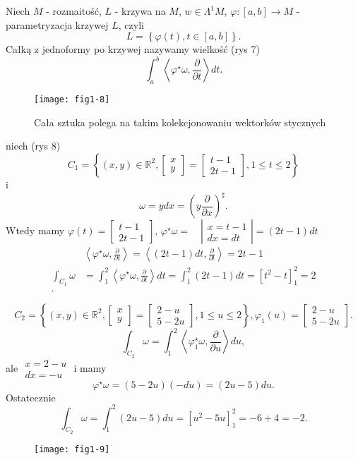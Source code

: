 \documentclass[../main.tex]{subfiles}
\begin{document}
\pagebreak
\begin{definicja}
    Niech $M$ - rozmaitość, $L$ - krzywa na $M$, $w\in \Lambda^1M$, $\varphi: [a,b] \to M$ - parametryzacja krzywej $L$, czyli
    \[
        L = \left\{ \varphi(t), t\in [a,b] \right\}
    .\]
Całką z jednoformy po krzywej nazywamy wielkość (rys 7)
\[
\int_a^b \left<\varphi^\star \omega, \frac{\partial }{\partial t}  \right>dt
.\]
\end{definicja}
\begin{figure}[h]
    \centering
    \texttt{[image: fig1-8]}
    \caption{Cała sztuka polega na takim kolekcjonowaniu wektorków stycznych}
    \label{fig:fig1-8}
\end{figure}
\begin{przyklad}
    niech (rys 8)
 \[
     C_1 = \left\{ (x,y)\in \mathbb{R}^2, \begin{bmatrix} x\\y \end{bmatrix} = \begin{bmatrix} t-1\\2t-1 \end{bmatrix}, 1\le t\le 2 \right\}
\]
i
    \[
        \omega = ydx = \left( y \frac{\partial }{\partial x}  \right)^\sharp
    .\]
Wtedy mamy $\varphi(t) = \begin{bmatrix} t-1\\2t-1 \end{bmatrix} $, $\varphi^\star \omega =\quad \left| \begin{matrix}x=t-1\\dx = dt\end{matrix}\right| = (2t-1)dt$
    \begin{align*}
        &\left<\varphi^\star \omega, \frac{\partial }{\partial t}  \right> = \left<(2t-1)dt, \frac{\partial }{\partial t}  \right> = 2t-1\\
        \int_{C_1}\omega &= \int_1^2\left<\varphi^\star\omega, \frac{\partial }{\partial t}  \right>dt = \int_1^2 (2t-1)dt = \left[ t^2 - t \right]_1^2 =  2\\
    .\end{align*}

    \[
        C_2 = \left\{ (x,y)\in \mathbb{R}^2, \begin{bmatrix} x\\y \end{bmatrix} = \begin{bmatrix} 2-u\\5-2u \end{bmatrix}, 1\le u \le 2 \right\}, \varphi_1(u) = \begin{bmatrix} 2-u\\5-2u \end{bmatrix}
    .\]
\[
\int_{C_2}\omega = \int_1^2 \left<\varphi_1^\star \omega, \frac{\partial }{\partial u}  \right>du
,\]
ale $\begin{matrix}x = 2-u\\ dx = -u\end{matrix}$ i mamy
     \[
         \varphi^\star \omega = (5-2u)(-du) = (2u-5)du
    .\]
Ostatecznie
\[
    \int_{C_2}\omega = \int_1^2(2u-5)du = \left[ u^2 - 5u \right] _1^2 = -6+4 = -2
.\]
\end{przyklad}
\begin{figure}[h]
    \centering
    \texttt{[image: fig1-9]}
    \caption{}
    \label{fig:fig1-9}
\end{figure}
\end{document}

